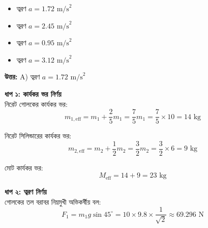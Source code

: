 \documentclass[12pt, a4paper]{article}
\begin{document}
{{\begin{center}
\end{center}
\vspace{1em}

\begin{itemize}[label={}, leftmargin=1cm, itemsep=0.5em]
    \item[\textbf{A)}] ত্বরণ $a = 1.72\text{ m/s}^2$
    \item[\textbf{B)}] ত্বরণ $a = 2.45\text{ m/s}^2$
    \item[\textbf{C)}] ত্বরণ $a = 0.95\text{ m/s}^2$
    \item[\textbf{D)}] ত্বরণ $a = 3.12\text{ m/s}^2$
\end{itemize}

\vspace{0.5em}
\begin{tcolorbox}[answerbox]
    \textbf{\color{success} উত্তর:} A) ত্বরণ $a = 1.72\text{ m/s}^2$
\end{tcolorbox}
\vspace{1em}

\begin{tcolorbox}[solutionbox={সমাধান (Solution)}]
    \noindent
    \textbf{ধাপ ১: কার্যকর ভর নির্ণয়} \\
    নিরেট গোলকের কার্যকর ভর:
    \[ m_{1, \text{eff}} = m_1 + \frac{2}{5} m_1 = \frac{7}{5} m_1 = \frac{7}{5} \times 10 = 14\text{ kg} \]
    
    নিরেট সিলিন্ডারের কার্যকর ভর:
    \[ m_{2, \text{eff}} = m_2 + \frac{1}{2} m_2 = \frac{3}{2} m_2 = \frac{3}{2} \times 6 = 9\text{ kg} \]
    
    মোট কার্যকর ভর:
    \[ M_{\text{eff}} = 14 + 9 = 23\text{ kg} \]
    
    \vspace{0.5em}
    \noindent\textbf{ধাপ ২: ত্বরণ নির্ণয়} \\
    গোলকের তল বরাবর নিম্নমুখী অভিকর্ষীয় বল:
    \[ F_1 = m_1 g \sin 45^\circ = 10 \times 9.8 \times \frac{1}{\sqrt{2}} \approx 69.296\text{ N} \]
    

\end{tcolorbox}}}
\end{document}

